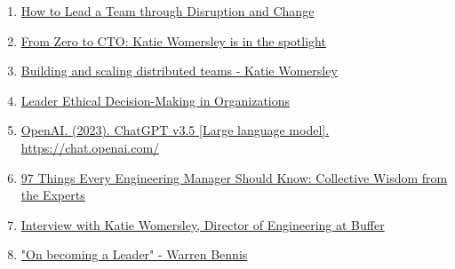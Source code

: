 \documentclass[10pt]{article}
\begin{document}
\begin{enumerate}
    \item \href{https://sponge.io/how-to-lead-a-team-through-disruption-and-change/}{How to Lead a Team through Disruption and Change}
    \item \href{https://ctocraft.com/blog/from-zero-to-cto-katie-womersley-is-in-the-spotlight/}{From Zero to CTO: Katie Womersley is in the spotlight}
    \item \href{https://youtube.com/watch?v=lam-94VHHsM}{Building and scaling distributed teams - Katie Womersley}
    \item \href{https://link.springer.com/article/10.1007/s10551-012-1299-1}{Leader Ethical Decision-Making in Organizations}
    \item \href{https://chat.openai.com/}{OpenAI. (2023). ChatGPT v3.5 [Large language model]. https://chat.openai.com/}
    \item \href{https://dokumen.pub/97-things-every-engineering-manager-should-know-collective-wisdom-from-the-experts-1nbsped-1492050903-9781492050902.html}{97 Things Every Engineering Manager Should Know: Collective Wisdom from the Experts}
    \item \href{https://www.managersclub.com/katie-womersley/}{Interview with Katie Womersley, Director of Engineering at Buffer}
    \item \href{https://gmdconsulting.eu/nykerk/wp-content/uploads/2020/02/On_Becoming_a_Leader-Bennis-summary.pdf}{"On becoming a Leader" - Warren Bennis}

\end{enumerate}
\end{document}

